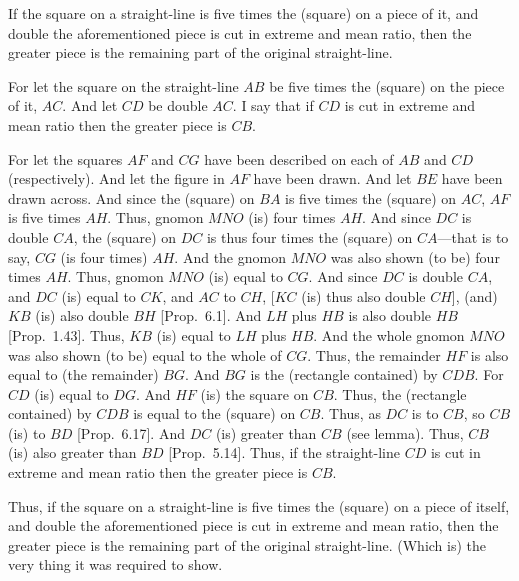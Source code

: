 \begin{Parallel}{}{}
{If the square on a straight-line is five times the (square) on a piece of
it, and  double the aforementioned piece is cut in extreme and
mean ratio, then the greater piece  is  the remaining part of the
original straight-line. 

\epsfysize=2.5in
\centerline{}

For let the square on the straight-line $AB$ be five times the (square)
on the piece of it, $AC$. And let $CD$ be double $AC$. I say that
if $CD$ is cut in extreme and mean ratio then the greater piece
is $CB$. 

For let the squares $AF$ and $CG$ have been described on each of
$AB$ and $CD$ (respectively). And let the figure  in $AF$ have been drawn.
And let $BE$ have been drawn across. And since the (square) on $BA$
is five times the (square) on $AC$, $AF$ is five times $AH$. 
Thus, gnomon $MNO$ (is) four times $AH$. 
And since
$DC$ is double $CA$, the (square) on $DC$ is thus four times the (square)
on $CA$---that is to say, $CG$ (is four times) $AH$. And the gnomon
$MNO$ was also shown (to be) four times $AH$. Thus, gnomon $MNO$
(is) equal to $CG$. And since $DC$ is double $CA$, and $DC$
(is) equal to $CK$, and $AC$ to $CH$, [$KC$ (is) thus also double $CH$], (and) $KB$ (is) also double $BH$
[Prop.~6.1]. And $LH$ plus $HB$ is also double $HB$ [Prop.~1.43].
Thus, $KB$ (is) equal to $LH$ plus $HB$. And the whole gnomon
$MNO$ was also shown (to be) equal to the whole of $CG$. Thus, the
remainder $HF$ is also equal to (the remainder) $BG$.  And $BG$
is the (rectangle contained) by $CDB$. For  $CD$ (is) equal to $DG$.
And $HF$ (is) the square on $CB$. Thus, the (rectangle contained)
by $CDB$ is equal to the (square) on $CB$. Thus, as $DC$ is to $CB$,
so $CB$ (is) to $BD$ [Prop.~6.17]. And $DC$ (is) greater than $CB$ (see lemma). Thus, $CB$ (is) also greater than $BD$ [Prop.~5.14]. Thus, if the
straight-line $CD$ is cut in extreme and mean ratio then the greater piece is $CB$.

Thus, if the square on a straight-line is five times the (square) on a piece of
itself, and  double the aforementioned piece is cut in extreme and
mean ratio, then the greater piece is the remaining part of the
original straight-line.  (Which is) the very thing it was required to show.}
\end{Parallel}


